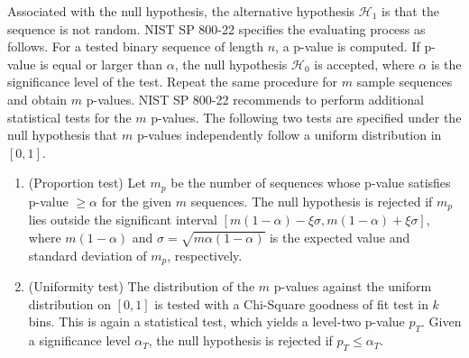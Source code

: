 Associated with the null hypothesis, the alternative hypothesis $\mathcal{H}_1$ is that the sequence is not random.
NIST SP 800-22 specifies the evaluating process as follows.
For a tested binary sequence of length $n$, a p-value is computed. If p-value is equal or larger than $\alpha$, the null hypothesis $\mathcal{H}_0$ is accepted, where $\alpha$ is the significance level of the test. Repeat the same procedure for $m$ sample sequences and obtain $m$ p-values. 
%
NIST SP 800-22 recommends to perform additional statistical tests for the $m$ p-values.
The following two tests are specified under the null hypothesis that $m$ p-values independently follow a uniform distribution in $[0,1]$.
\begin{enumerate}
  \item (Proportion test) Let $m_p$ be the number of sequences whose p-value satisfies p-value $\geq \alpha$ for the given $m$ sequences. The null hypothesis is rejected if $m_p$ lies outside the significant interval $[m(1-\alpha)-\xi\sigma, m(1-\alpha)+\xi\sigma]$, where $m(1-\alpha)$ and $\sigma = \sqrt{m\alpha(1-\alpha)}$ is the expected value and  standard deviation of $m_p$, respectively.
  \item (Uniformity test) The distribution of the $m$ p-values against the uniform distribution on $[0,1]$ is tested with a Chi-Square goodness of fit test in $k$ bins. This is again a statistical test, which yields a level-two p-value $p_T$. Given a significance level $\alpha_T$, the null hypothesis is rejected if $p_T \leq \alpha_T$.
\end{enumerate}
